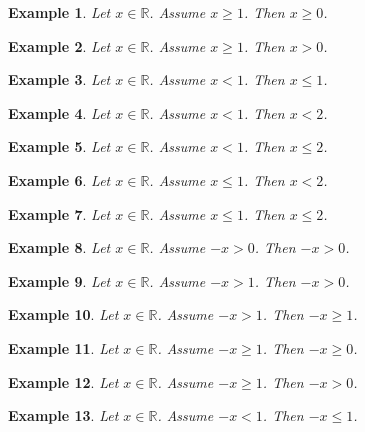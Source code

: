 \documentclass{article}
\newtheorem{example}{Example}
\begin{document}
\begin{example}
Let $x\in\mathbb{R}$. Assume $x\ge 1$. Then $x\ge 0$.
\end{example}

\begin{example}
Let $x\in\mathbb{R}$. Assume $x\ge 1$. Then $x> 0$.
\end{example}

\begin{example}
Let $x\in\mathbb{R}$. Assume $x<1$. Then $x\le 1$.
\end{example}

\begin{example}
Let $x\in\mathbb{R}$. Assume $x<1$. Then $x<2$.
\end{example}

\begin{example}
Let $x\in\mathbb{R}$. Assume $x<1$. Then $x\le 2$.
\end{example}

\begin{example}
Let $x\in\mathbb{R}$. Assume $x\le 1$. Then $x<2$.
\end{example}

\begin{example}
Let $x\in\mathbb{R}$. Assume $x\le 1$. Then $x\le 2$.
\end{example}



\begin{example}
Let $x\in\mathbb{R}$. Assume $-x>0$. Then $-x>0$.
\end{example}

\begin{example}
Let $x\in\mathbb{R}$. Assume $-x>1$. Then $-x>0$.
\end{example}

\begin{example}
Let $x\in\mathbb{R}$. Assume $-x>1$. Then $-x\ge 1$.
\end{example}

\begin{example}
Let $x\in\mathbb{R}$. Assume $-x\ge 1$. Then $-x\ge 0$.
\end{example}

\begin{example}
Let $x\in\mathbb{R}$. Assume $-x\ge 1$. Then $-x> 0$.
\end{example}

\begin{example}
Let $x\in\mathbb{R}$. Assume $-x<1$. Then $-x\le 1$.
\end{example}
\end{document}
